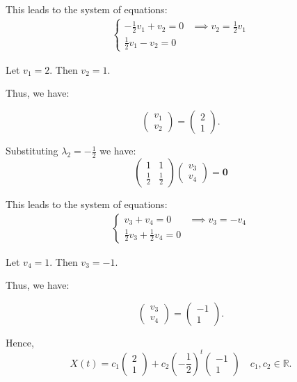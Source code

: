\documentclass [a4paper]{article}
\begin{document}
This leads to the system of equations:
\begin{align*}
\begin{cases}
-\frac{1}{2} v_1 + v_2 = 0 & \implies v_2 = \frac{1}{2} v_1 \\[1em]
\frac{1}{2} v_1 - v_2 = 0 &
\end{cases}
\end{align*}

Let \(v_1 = 2\).
Then \(v_2 = 1.\)

Thus, we have: 

\[
\begin{pmatrix} v_1 \\ v_2 \end{pmatrix} = \begin{pmatrix} 2 \\ 1 \end{pmatrix}.
\]

Substituting \(\lambda_2 = -\frac{1}{2}\) we have:
\[
\begin{pmatrix} 1  &  1 \\ \frac{1}{2} & \frac{1}{2} \end{pmatrix} \begin{pmatrix} v_3 \\ v_4 \end{pmatrix} = \mathbf{0}
\]

This leads to the system of equations:
\begin{align*}
\begin{cases}
v_3 + v_4 = 0 & \implies v_3 = -v_4 \\[1em]
\frac{1}{2}v_3 + \frac{1}{2} v_4 = 0 &
\end{cases}
\end{align*}

Let \(v_4 = 1\).
Then \(v_3 = -1.\)

Thus, we have: 

\[
\begin{pmatrix} v_3 \\ v_4 \end{pmatrix} = \begin{pmatrix} -1 \\ 1 \end{pmatrix}.
\]

Hence, 
\[ X(t) = c_1\begin{pmatrix}
    2 \\ 1
\end{pmatrix} + c_2{\left(-\frac{1}{2}\right)}^t\begin{pmatrix}
    -1\\ 1 
\end{pmatrix} \quad c_1,c_2 \in \mathbb{R}.\]
\end{document}
